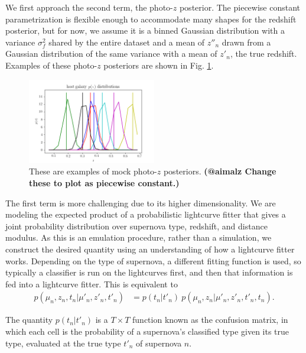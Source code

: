\documentclass[12pt, onecolumn]{emulateapj}
\begin{document}
We first approach the second term, the photo-$z$ posterior.  The piecewise constant parametrization is flexible enough to accommodate many shapes for the redshift posterior, but for now, we assume it is a binned Gaussian distribution with a variance $\sigma_{f}^{2}$ shared by the entire dataset and a mean of $z''_{n}$ drawn from a Gaussian distribution of the same variance with a mean of $z'_{n}$, the true redshift.  Examples of these photo-$z$ posteriors are shown in Fig. \ref{fig:pzs}.

\begin{figure}
	\begin{center}
		\includegraphics[width=0.5\textwidth]{fig/host_likelihoods.png}
		\caption{These are examples of mock photo-$z$ posteriors.  \textbf{(@aimalz Change these to plot as piecewise constant.)}}
		\label{fig:pzs}
	\end{center}
\end{figure}

The first term is more challenging due to its higher dimensionality.  We are modeling the expected product of a probabilistic lightcurve fitter that gives a joint probability distribution over supernova type, redshift, and distance modulus.  As this is an emulation procedure, rather than a simulation, we construct the desired quantity using an understanding of how a lightcurve fitter works.  Depending on the type of supernova, a different fitting function is used, so typically a classifier is run on the lightcurves first, and then that information is fed into a lightcurve fitter.  This is equivalent to
\begin{align}
\label{eq:lc_fit_model}
p(\mu_{n}, z_{n}, t_{n} | \mu'_{n}, z'_{n}, t'_{n}) &= p(t_{n} | t'_{n})\ p(\mu_{n}, z_{n} | \mu'_{n}, z'_{n}, t'_{n}, t_{n}).
\end{align}

The quantity $p(t_{n} | t'_{n})$ is a $T\times T$ function known as the confusion matrix, in which each cell is the probability of a supernova's classified type given its true type, evaluated at the true type $t'_{n}$ of supernova $n$.
\end{document}
